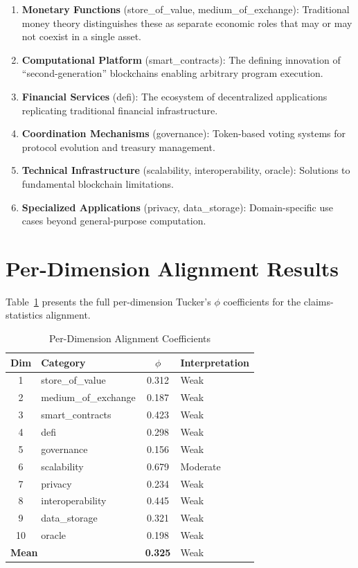 \documentclass[11pt,twocolumn]{article}
\begin{document}
\begin{enumerate}
    \item \textbf{Monetary Functions} (store\_of\_value, medium\_of\_exchange): Traditional money theory distinguishes these as separate economic roles that may or may not coexist in a single asset.

    \item \textbf{Computational Platform} (smart\_contracts): The defining innovation of ``second-generation'' blockchains enabling arbitrary program execution.

    \item \textbf{Financial Services} (defi): The ecosystem of decentralized applications replicating traditional financial infrastructure.

    \item \textbf{Coordination Mechanisms} (governance): Token-based voting systems for protocol evolution and treasury management.

    \item \textbf{Technical Infrastructure} (scalability, interoperability, oracle): Solutions to fundamental blockchain limitations.

    \item \textbf{Specialized Applications} (privacy, data\_storage): Domain-specific use cases beyond general-purpose computation.
\end{enumerate}

\section{Per-Dimension Alignment Results}
\label{app:dimension_results}

Table~\ref{tab:per_dim} presents the full per-dimension Tucker's $\phi$ coefficients for the claims-statistics alignment.

\begin{table}[H]
\centering
\caption{Per-Dimension Alignment Coefficients}
\label{tab:per_dim}
\begin{tabular}{@{}clcl@{}}
\toprule
\textbf{Dim} & \textbf{Category} & \textbf{$\phi$} & \textbf{Interpretation} \\
\midrule
1 & store\_of\_value & 0.312 & Weak \\
2 & medium\_of\_exchange & 0.187 & Weak \\
3 & smart\_contracts & 0.423 & Weak \\
4 & defi & 0.298 & Weak \\
5 & governance & 0.156 & Weak \\
6 & scalability & 0.679 & Moderate \\
7 & privacy & 0.234 & Weak \\
8 & interoperability & 0.445 & Weak \\
9 & data\_storage & 0.321 & Weak \\
10 & oracle & 0.198 & Weak \\
\midrule
\multicolumn{2}{l}{\textbf{Mean}} & \textbf{0.325} & Weak \\
\bottomrule
\end{tabular}
\end{table}
\end{document}
